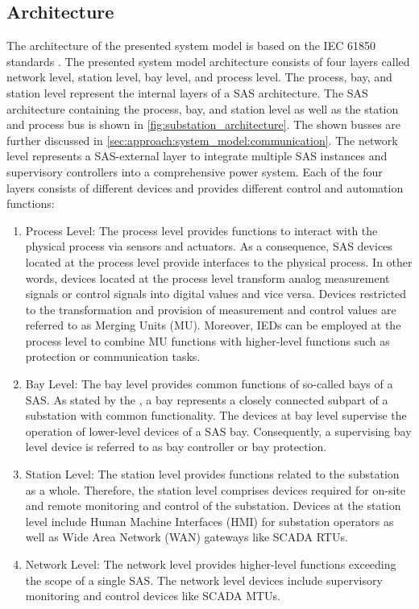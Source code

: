 \subsection{Architecture}
The architecture of the presented system model is based on the IEC 61850 standards \cite{IEC61850P5}.
The presented system model architecture consists of four layers called network level, station level, bay level, and process level.
The process, bay, and station level represent the internal layers of a SAS architecture.
The SAS architecture containing the process, bay, and station level as well as the station and process bus is shown in \autoref{fig:substation_architecture}.
The shown busses are further discussed in \autoref{sec:approach:system_model:communication}.
The network level represents a SAS-external layer to integrate multiple SAS instances and supervisory controllers into a comprehensive power system.
Each of the four layers consists of different devices and provides different control and automation functions:
\begin{enumerate}
    \item Process Level: The process level provides functions to interact with the physical process via sensors and actuators.
    As a consequence, SAS devices located at the process level provide interfaces to the physical process.
    In other words, devices located at the process level transform analog measurement signals or control signals into digital values and vice versa.
    Devices restricted to the transformation and provision of measurement and control values are referred to as Merging Units (MU).
    Moreover, IEDs can be employed at the process level to combine MU functions with higher-level functions such as protection or communication tasks.

    \item Bay Level: The bay level provides common functions of so-called bays of a SAS.
    As stated by the \citeauthor{IEC61850P5} \cite{IEC61850P5}, a bay represents a closely connected subpart of a substation with common functionality.
    The devices at bay level supervise the operation of lower-level devices of a SAS bay.
    Consequently, a supervising bay level device is referred to as bay controller or bay protection.

    \item Station Level: The station level provides functions related to the substation as a whole.
    Therefore, the station level comprises devices required for on-site and remote monitoring and control of the substation.
    Devices at the station level include Human Machine Interfaces (HMI) for substation operators as well as Wide Area Network (WAN) gateways like SCADA RTUs.

    \item Network Level: The network level provides higher-level functions exceeding the scope of a single SAS.
    The network level devices include supervisory monitoring and control devices like SCADA MTUs.
\end{enumerate}
